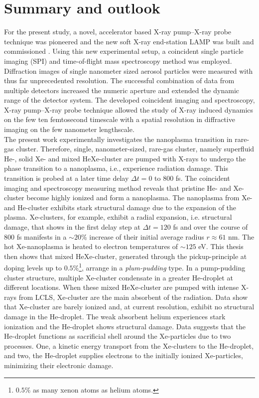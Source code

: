 \chapter{Summary and outlook}\label{ch:summary_outlook}
For the present study, a novel, accelerator based X-ray pump--X-ray probe technique was pioneered \citep{Lutman-2013-PRL} and the new soft X-ray end-station LAMP was built and commissioned \citep{Ferguson-2015-JSR}. Using this new experimental setup, a coincident single particle imaging (SPI) and time-of-flight mass spectroscopy method was employed. Diffraction images of single nanometer sized aerosol particles were measured with thus far unprecedented resolution. The successful combination of data from multiple detectors increased the numeric aperture and extended the dynamic range of the detector system. The developed coincident imaging and spectroscopy, X-ray pump--X-ray probe technique allowed the study of X-ray induced dynamics on the few ten femtosecond timescale with a spatial resolution in diffractive imaging on the few nanometer lengthscale.\\
%
The present work experimentally investigates the nanoplasma transition in rare-gas cluster. Therefore, single, nanometer-sized, rare-gas cluster, namely superfluid He-, solid Xe- and mixed HeXe-cluster are pumped with X-rays to undergo the phase transition to a nanoplasma, i.e., experience radiation damage. This transition is probed at a later time delay $\Delta t=0$ to $800$ fs. The coincident imaging and spectroscopy measuring method reveals that pristine He- and Xe-cluster become highly ionized and form a nanoplasma. The nanoplasma from Xe- and He-cluster exhibits stark structural damage due to the expansion of the plasma. Xe-clusters, for example, exhibit a radial expansion, i.e. structural damage, that shows in the first delay step at $\Delta t = 120$ fs and over the course of 800 fs manifests in a $\sim 20 \%$ increase of their initial average radius $r\approx 61$ nm. The hot Xe-nanoplasma is heated to electron temperatures of $\sim 125$ eV. This thesis then shows that mixed HeXe-cluster, generated through the pickup-principle at doping levels up to $0.5\%$\footnote{$0.5\%$ as many xenon atoms as helium atoms.}, arrange in a \textit{plum-pudding} type. In a pump-pudding cluster structure, multiple Xe-cluster condensate in a greater He-droplet at different locations. When these mixed HeXe-cluster are pumped with intense X-rays from LCLS, Xe-cluster are the main absorbent of the radiation. Data show that Xe-cluster are barely ionized and, at current resolution, exhibit no structural damage in the He-droplet. The weak absorbent helium experiences stark ionization and the He-droplet shows structural damage. Data suggests that the He-droplet functions as sacrificial shell around the Xe-particles due to two processes. One, a kinetic energy transport from the Xe-clusters to the He-droplet, and two, the He-droplet supplies electrons to the initially ionized Xe-particles, minimizing their electronic damage.\\
